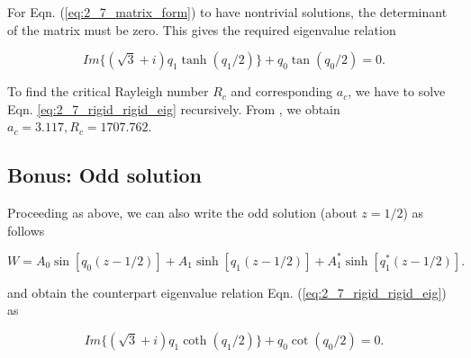 For Eqn. (\ref{eq:2_7_matrix_form}) to have nontrivial solutions, the determinant of the matrix must be zero. This gives the required eigenvalue relation

\begin{equation}\label{eq:2_7_rigid_rigid_eig}
\boxed{
 Im \{(\sqrt{3} + i)q_{1} \tanh{(q_{1}/2)} \} + q_{0} \tan{(q_{0}/2)} = 0
 }.
\end{equation}

To find the critical Rayleigh number $R_{c}$ and corresponding $a_{c}$, we have to solve Eqn. \ref{eq:2_7_rigid_rigid_eig} recursively. From \cite{reid1958some}, we obtain $a_{c} = 3.117, R_{c} = 1707.762$. 
\subsection{Bonus: Odd solution}
Proceeding as above, we can also write the odd solution (about $z = 1/2$) as follows

\begin{equation}\label{eq:2_7_odd_soln}
\boxed{
 W = A_{0} \sin{[q_{0}(z-1/2)]} + A_{1} \sinh{[q_{1}(z-1/2)]} + A^{*}_{1} \sinh{[q^{*}_{1}(z-1/2)]}
 }.
\end{equation}

and obtain the counterpart eigenvalue relation Eqn. (\ref{eq:2_7_rigid_rigid_eig}) as


\begin{equation}\label{eq:2_7_rigid_rigid_eig_2}
\boxed{
 Im \{(\sqrt{3} + i)q_{1} \coth{(q_{1}/2)} \} + q_{0} \cot{(q_{0}/2)} = 0
 }.
\end{equation}
